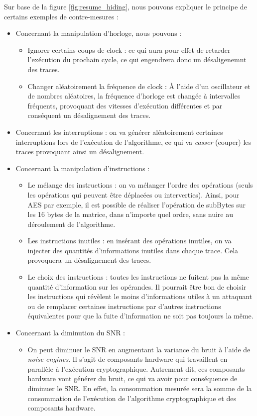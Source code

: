 \documentclass[10pt, oneside, a4paper]{article}
\begin{document}
\vspace{-0.4 cm}\hspace{-0.5 cm}Sur base de la figure \ref{fig:resume_hiding}, nous pouvons expliquer le principe de certains exemples de contre-mesures :
\begin{itemize}
\item Concernant la manipulation d’horloge, nous pouvons :
\begin{itemize}
\item Ignorer certains coups de clock : ce qui aura pour effet de retarder l’exécution du prochain cycle, ce qui engendrera donc un désaligenemnt des traces.
\item Changer aléatoirement la fréquence de clock : À l’aide d’un oscillateur et de nombres aléatoires, la fréquence d’horloge est changée à intervalles fréquents, provoquant des vitesses d’exécution différentes et par conséquent un désalignement des traces.
\end{itemize}
\item Concernant les interruptions : on va générer aléatoirement certaines interruptions lors de l'exécution de l'algorithme, ce qui va \textit{casser} (couper) les traces provoquant ainsi un désalignement.
\item Concernant la manipulation d'instructions : 
\begin{itemize}
\item Le mélange des instructions : on va mélanger l’ordre des opérations (seuls les opérations qui peuvent être déplacées ou interverties). Ainsi, pour AES par exemple, il est possible de réaliser l’opération de subBytes sur les 16 bytes de la matrice, dans n’importe quel ordre, sans nuire au déroulement de l’algorithme.
\item Les instructions inutiles : en insérant des opérations inutiles, on va injecter des quantités d'informations inutiles dans chaque trace. Cela provoquera un désalignement des traces.
\item Le choix des instructions : toutes les instructions ne fuitent pas la même quantité d’information sur les opérandes. Il pourrait être bon de choisir les instructions qui révèlent le moins d’informations utiles à un attaquant ou de remplacer certaines instructions par d’autres instructions équivalentes pour que la fuite d’information ne soit pas toujours la même.
\end{itemize}
\item Concernant la diminution du SNR :
\begin{itemize}
\item On peut diminuer le SNR en augmentant la variance du bruit à l'aide de \textit{noise engines}. Il s'agit de composants hardware qui travaillent en parallèle à l’exécution cryptographique. Autrement dit, ces composants hardware vont générer du bruit, ce qui va avoir pour conséquence de diminuer le SNR. En effet, la consommation mesurée sera la somme de la consommation de l’exécution de l’algorithme cryptographique et des composants hardware.

\end{itemize}
\end{itemize}
\end{document}
